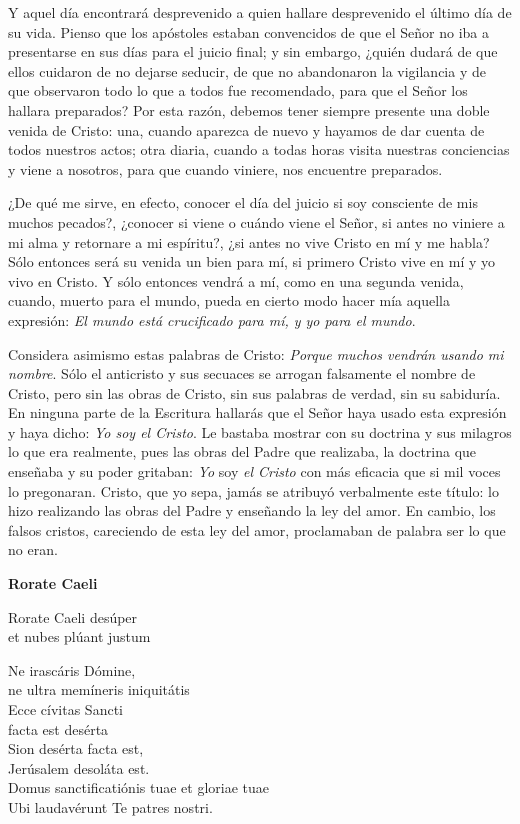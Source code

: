 			Y aquel día encontrará desprevenido a quien hallare desprevenido el último día de su vida. Pienso que los apóstoles estaban convencidos de que el Señor no iba a presentarse en sus días para el juicio final; y sin embargo, ¿quién dudará de que ellos cuidaron de no dejarse seducir, de que no abandonaron la vigilancia y de que observaron todo lo que a todos fue recomendado, para que el Señor los hallara preparados? Por esta razón, debemos tener siempre presente una doble venida de Cristo: una, cuando aparezca de nuevo y hayamos de dar cuenta de todos nuestros actos; otra diaria, cuando a todas horas visita nuestras conciencias y viene a nosotros, para que cuando viniere, nos encuentre preparados.
			
			¿De qué me sirve, en efecto, conocer el día del juicio si soy consciente de mis muchos pecados?, ¿conocer si viene o cuándo viene el Señor, si antes no viniere a mi alma y retornare a mi espíritu?, ¿si antes no vive Cristo en mí y me habla? Sólo entonces será su venida un bien para mí, si primero Cristo vive en mí y yo vivo en Cristo. Y sólo entonces vendrá a mí, como en una segunda venida, cuando, muerto para el mundo, pueda en cierto modo hacer mía aquella expresión: \emph{El mundo está crucificado para mí, y yo para el mundo}.
			
			Considera asimismo estas palabras de Cristo: \emph{Porque muchos vendrán usando mi nombre}. Sólo el anticristo y sus secuaces se arrogan falsamente el nombre de Cristo, pero sin las obras de Cristo, sin sus palabras de verdad, sin su sabiduría. En ninguna parte de la Escritura hallarás que el Señor haya usado esta expresión y haya dicho: \emph{Yo soy el Cristo}. Le bastaba mostrar con su doctrina y sus milagros lo que era realmente, pues las obras del Padre que realizaba, la doctrina que enseñaba y su poder gritaban: \emph{Yo} soy \emph{el Cristo} con más eficacia que si mil voces lo pregonaran. Cristo, que yo sepa, jamás se atribuyó verbalmente este título: lo hizo realizando las obras del Padre y enseñando la ley del amor. En cambio, los falsos cristos, careciendo de esta ley del amor, proclamaban de palabra ser lo que no eran.

\textbf{Rorate Caeli}

Rorate Caeli desúper\\ et nubes plúant justum

Ne irascáris Dómine,\\ ne ultra memíneris iniquitátis\\ Ecce cívitas Sancti\\ facta est desérta\\ Sion desérta facta est,\\ Jerúsalem desoláta est.\\ Domus sanctificatiónis tuae et gloriae tuae\\ Ubi laudavérunt Te patres nostri.

